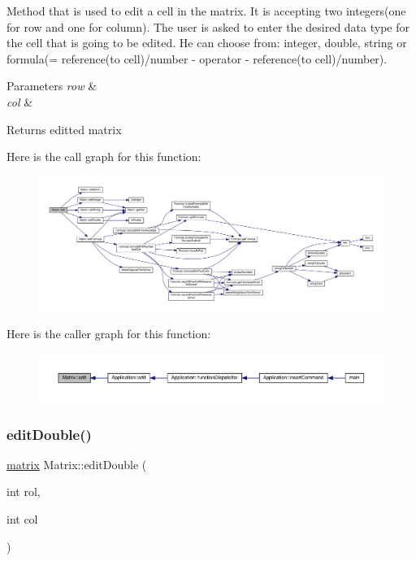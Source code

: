 Method that is used to edit a cell in the matrix. It is accepting two integers(one for row and one for column). The user is asked to enter the desired data type for the cell that is going to be edited. He can choose from\+: integer, double, string or formula(= reference(to cell)/number -\/ operator -\/ reference(to cell)/number). 
\begin{DoxyParams}{Parameters}
{\em row} & \\
\hline
{\em col} & \\
\hline
\end{DoxyParams}
\begin{DoxyReturn}{Returns}
editted matrix 
\end{DoxyReturn}
Here is the call graph for this function\+:
\nopagebreak
\begin{figure}[H]
\begin{center}
\leavevmode
\includegraphics[width=350pt]{class_matrix_a34b2269a2b6d06c202439de2e64009ba_cgraph}
\end{center}
\end{figure}
Here is the caller graph for this function\+:
\nopagebreak
\begin{figure}[H]
\begin{center}
\leavevmode
\includegraphics[width=350pt]{class_matrix_a34b2269a2b6d06c202439de2e64009ba_icgraph}
\end{center}
\end{figure}
\mbox{\label{class_matrix_a147d3813e96ef757fb0d5ff65e5f97ef}} 
\subsubsection{\texorpdfstring{edit\+Double()}{editDouble()}}
{\footnotesize\ttfamily \hyperlink{formula_8h_a869e2a5deeb3daa4c82d6bc91cf20d92}{matrix} Matrix\+::edit\+Double (\begin{DoxyParamCaption}\item[{int}]{rol,  }\item[{int}]{col }\end{DoxyParamCaption})\hspace{0.3cm}{\ttfamily [private]}}

